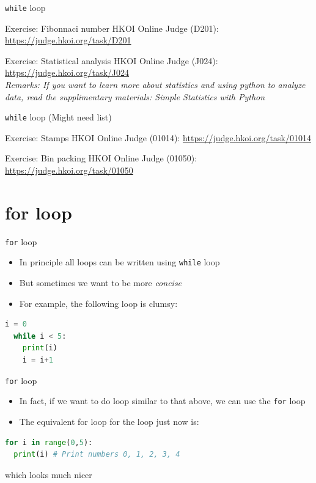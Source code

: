\documentclass[10pt,xcolor={table,dvipsnames},t]{beamer}
\begin{document}
\begin{frame}{\texttt{while} loop}
  \begin{exampleblock}{Exercise: Fibonnaci number}
    HKOI Online Judge (D201): \url{https://judge.hkoi.org/task/D201}
  \end{exampleblock}
  \begin{exampleblock}{Exercise: Statistical analysis}
    HKOI Online Judge (J024): \url{https://judge.hkoi.org/task/J024}\\
    \textit{Remarks: If you want to learn more about statistics and using python to analyze data, read the supplimentary materials: Simple Statistics with Python}
  \end{exampleblock}
\end{frame}

\begin{frame}{\texttt{while} loop (Might need list)}
  \begin{exampleblock}{Exercise: Stamps}
    HKOI Online Judge (01014): \url{https://judge.hkoi.org/task/01014}
  \end{exampleblock}
  \begin{exampleblock}{Exercise: Bin packing}
    HKOI Online Judge (01050): \url{https://judge.hkoi.org/task/01050}
  \end{exampleblock}
\end{frame}

\section{for loop}
\begin{frame}[fragile]{\texttt{for} loop}
  \begin{itemize}
    \item In principle all loops can be written using \texttt{while} loop
    \item But sometimes we want to be more \textit{concise}
    \item For example, the following loop is clumsy:
  \end{itemize}
\begin{lstlisting}[language=python]
  i = 0
  while i < 5:
    print(i)
    i = i+1
\end{lstlisting}
\end{frame}

\begin{frame}[fragile]{\texttt{for} loop}
  \begin{itemize}
    \item In fact, if we want to do loop similar to that above, we can use the \texttt{for} loop 
    \item The equivalent for loop for the loop just now is:
  \end{itemize}
\begin{lstlisting}[language=python]
for i in range(0,5):
  print(i) # Print numbers 0, 1, 2, 3, 4 
\end{lstlisting}
which looks much nicer
\end{frame}
\end{document}
